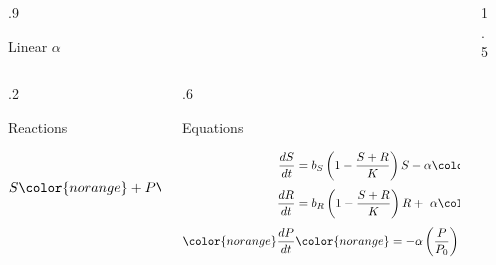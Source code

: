 \documentclass[final]{beamer}
\newlength{\sepwid}
\newlength{\onecolwid}
\begin{document}
\begin{frame}[t]
\begin{block}
\begin{columns}[t]
\begin{column}{.9\onecolwid}
\begin{block}{Linear $\alpha$}
    \begin{columns}[t]
      \begin{column}{.2\onecolwid}
        \begin{center}
          Reactions
        \end{center}
        \begin{align*}
          S & \stackrel{b_S}{\rightarrow} 2S \\
          S \color{norange}+ P\color{black} & \stackrel{\alpha}{\rightarrow}  R \\[0.8ex]
          R &\stackrel{b_R}{\rightarrow} 2R \\
          R &\stackrel{\delta}{\rightarrow} \varnothing
        \end{align*}
      \end{column}
        \vrule
      \begin{column}{.6\onecolwid}
        \begin{center}
          Equations
        \end{center}

        \begin{align*}
          \frac{dS}{dt} & = b_S \left(1 - \frac{S + R}{K}\right)S - \alpha
            \color{norange}\left( \frac{P}{P_0} \right)\color{black} S \\[0.8ex]
          \frac{dR}{dt} & = b_R \left(1 - \frac{S + R}{K}\right)R + \
            \alpha \color{norange}\left( \frac{P}{P_0} \right)\color{black} S - \delta R \\[0.8ex]
          \color{norange} \frac{dP}{dt} & \color{norange} = -\alpha \left( \frac{P}{P_0} \right) S \color{black}
        \end{align*}
      \end{column}
    \end{columns}
  \end{block}
\end{column}
\vrule width 5pt
\begin{column}{1.5\sepwid}\end{column} %
\begin{column}{\onecolwid}


\end{column}
\end{columns}
\end{block}
\end{frame}
\end{document}
